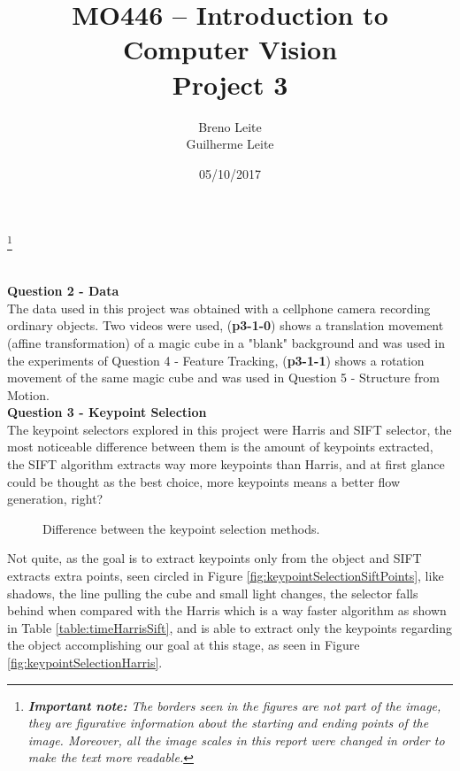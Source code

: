 \documentclass[12pt,a4paper]{article}
\title{MO446 -- Introduction to Computer Vision  \\ Project 3}
\author{Breno Leite  \\ Guilherme Leite}
\date{05/10/2017}
\newcommand\blfootnote[1]{%
	\begingroup
	\renewcommand\thefootnote{}\footnote{#1}%
	\addtocounter{footnote}{-1}%
	\endgroup
}
\begin{document}
\maketitle
\blfootnote{\textit{\textbf{Important note:} The borders seen in the figures are not part of the image, they are figurative information about the starting and ending points of the image. Moreover, all the image scales in this report were changed in order to make the text more readable.}} \\


\textbf{\LARGE Question 2 - Data} \\

	The data used in this project was obtained with a cellphone camera recording ordinary objects. Two videos were used, (\textbf{p3-1-0}) shows a translation movement  (affine transformation) of a magic cube in a "blank" background and was used in the experiments of Question 4 - Feature Tracking, (\textbf{p3-1-1}) shows a rotation movement of the same magic cube and was used in Question 5 - Structure from Motion.\\

\textbf{\LARGE Question 3 - Keypoint Selection} \\

	The keypoint selectors explored in this project were Harris and SIFT selector, the most noticeable difference between them is the amount of keypoints extracted, the SIFT algorithm extracts way more keypoints than Harris, and at first glance could be thought as the best choice, more keypoints means a better flow generation, right?

\begin{figure}[!h]
	\centering
	\quad
	\caption{Difference between the keypoint selection methods.}
	\label{fig:keypointSelection}
\end{figure}

	Not quite, as the goal is to extract keypoints only from the object and SIFT extracts extra points, seen circled in Figure \ref{fig:keypointSelectionSiftPoints}, like shadows, the line pulling the cube and small light changes, the selector falls behind when compared with the Harris which is a way faster algorithm as shown in Table \ref{table:timeHarrisSift}, and is able to extract only the keypoints regarding the object accomplishing our goal at this stage, as seen in Figure \ref{fig:keypointSelectionHarris}.
\end{document}
